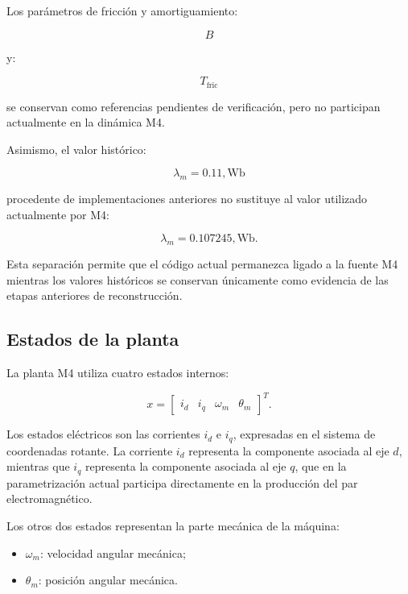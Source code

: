 Los parámetros de fricción y amortiguamiento:

\begin{equation}
B
\end{equation}

y:

\begin{equation}
T_{\mathrm{fric}}
\end{equation}

se conservan como referencias pendientes de verificación, pero no participan actualmente en la dinámica M4.

Asimismo, el valor histórico:

\begin{equation}
\lambda_m=0.11,\mathrm{Wb}
\end{equation}

procedente de implementaciones anteriores no sustituye al valor utilizado actualmente por M4:

\begin{equation}
\lambda_m=0.107245,\mathrm{Wb}.
\end{equation}

Esta separación permite que el código actual permanezca ligado a la fuente M4 mientras los valores históricos se conservan únicamente como evidencia de las etapas anteriores de reconstrucción.

\subsection{Estados de la planta}

La planta M4 utiliza cuatro estados internos:

\begin{equation}
x=
\begin{bmatrix}
i_d &
i_q &
\omega_m &
\theta_m
\end{bmatrix}^{T}.
\end{equation}

Los estados eléctricos son las corrientes $i_d$ e $i_q$, expresadas en el sistema de coordenadas rotante. La corriente $i_d$ representa la componente asociada al eje $d$, mientras que $i_q$ representa la componente asociada al eje $q$, que en la parametrización actual participa directamente en la producción del par electromagnético.

Los otros dos estados representan la parte mecánica de la máquina:

\begin{itemize}
\item $\omega_m$: velocidad angular mecánica;
\item $\theta_m$: posición angular mecánica.
\end{itemize}

